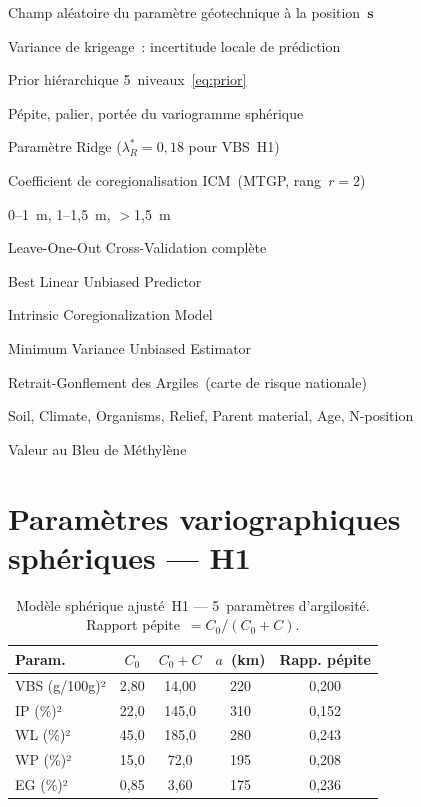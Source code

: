 \documentclass[10pt,a4paper,twocolumn]{article}
\newcommand{\bs}{\mathbf{s}}
\begin{document}
	\begin{description}[noitemsep]
		\item[$Z(\bs)$] Champ aléatoire du paramètre géotechnique à la position~$\bs$
		\item[$\sigma^2_K(\bs_0)$] Variance de krigeage~: incertitude locale de prédiction
		\item[$\mu_h(\bs)$] Prior hiérarchique 5~niveaux~\eqref{eq:prior}
		\item[$C_0,C,a$] Pépite, palier, portée du variogramme sphérique
		\item[$\lambda_R$] Paramètre Ridge ($\lambda_R^*=0{,}18$ pour VBS~H1)
		\item[$a_{dl}$] Coefficient de coregionalisation ICM~(MTGP, rang~$r=2$)
		\item[H1/H2/H3] 0--1~m, 1--1{,}5~m, $>$1{,}5~m
		\item[LOO-CV] Leave-One-Out Cross-Validation complète
		\item[BLUP] Best Linear Unbiased Predictor
		\item[ICM] Intrinsic Coregionalization Model
		\item[MVUE] Minimum Variance Unbiased Estimator
		\item[RGA] Retrait-Gonflement des Argiles~(carte de risque nationale)
		\item[SCORPAN] Soil, Climate, Organisms, Relief, Parent material, Age, N-position
		\item[VBS] Valeur au Bleu de Méthylène
	\end{description}
	
	\section{Paramètres variographiques sphériques --- H1}
	\label{app:variogrammes}
	
	\begin{table}[H]
		\centering\small
		\caption{Modèle sphérique ajusté~H1 --- 5~paramètres d'argilosité.
			Rapport pépite~$=C_0/(C_0+C)$.}
		\label{tab:variogrammes}
		\begin{tabular}{lcccc}
			\toprule
			Param. & $C_0$ & $C_0+C$ & $a$~(km) & Rapp. pépite \\
			\midrule
			VBS (g/100g)² & 2,80  & 14,00  & 220 & 0,200 \\
			IP (\%)²      & 22,0  & 145,0  & 310 & 0,152 \\
			WL (\%)²      & 45,0  & 185,0  & 280 & 0,243 \\
			WP (\%)²      & 15,0  & 72,0   & 195 & 0,208 \\
			EG (\%)²      & 0,85  & 3,60   & 175 & 0,236 \\
			\bottomrule
		\end{tabular}
	\end{table}
	
\end{document}
